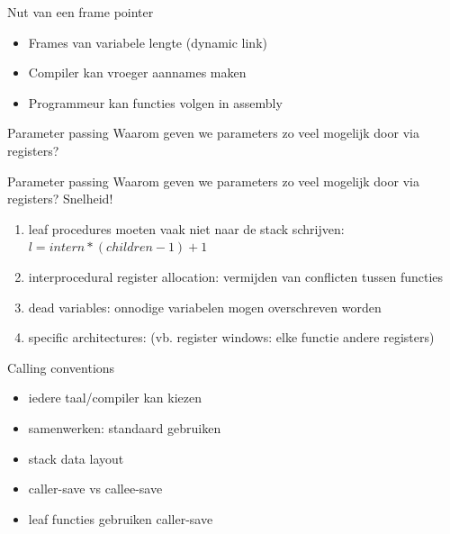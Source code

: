\documentclass{beamer}
\begin{document}


\begin{frame}{Nut van een frame pointer}
	\begin{itemize}
	    \item Frames van variabele lengte (dynamic link)
	    \item Compiler kan vroeger aannames maken
	    \item Programmeur kan functies volgen in assembly
	\end{itemize}
\end{frame}

\begin{frame}{Parameter passing}
	Waarom geven we parameters zo veel mogelijk door via registers?
\end{frame}

\begin{frame}{Parameter passing}
	Waarom geven we parameters zo veel mogelijk door via registers?
	Snelheid!
    \begin{enumerate}
        \item leaf procedures moeten vaak niet naar de stack schrijven: $l = intern * (children-1) + 1$
        \item interprocedural register allocation: vermijden van conflicten tussen functies
        \item dead variables: onnodige variabelen mogen overschreven worden
        \item specific architectures: (vb. register windows: elke functie andere registers)
    \end{enumerate}
\end{frame}

\begin{frame}{Calling conventions}
	\begin{itemize}
	    \item iedere taal/compiler kan kiezen
	    \item samenwerken: standaard gebruiken
	    \item stack data layout
	    \item caller-save vs callee-save
	    \item leaf functies gebruiken caller-save
	\end{itemize}
\end{frame}
\end{document}
